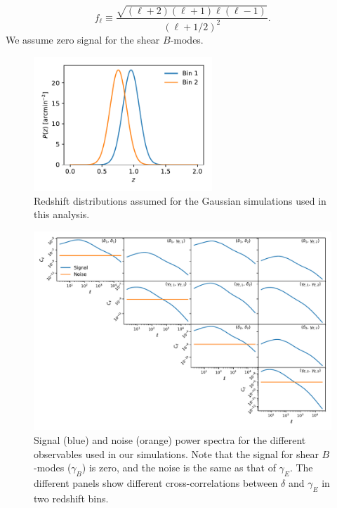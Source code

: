 \documentclass[a4paper,11pt]{article}
\begin{document}
      \begin{equation}
        f_\ell\equiv\frac{\sqrt{(\ell+2)(\ell+1)\ell(\ell-1)}}{(\ell+1/2)^2}.
      \end{equation}
      We assume zero signal for the shear $B$-modes.
      \begin{figure}
        \centering
        \includegraphics[width=0.6\textwidth]{./figures/pz.pdf}
        \caption{Redshift distributions assumed for the Gaussian simulations used in this analysis.}
        \label{fig:pz}
      \end{figure}
      \begin{figure}
        \centering
        \includegraphics[width=\textwidth]{./figures/cls-sph-2b.pdf}
        \caption{Signal (blue) and noise (orange) power spectra for the different observables used in our simulations. Note that the signal for shear $B$-modes ($\gamma_B$) is zero, and the noise is the same as that of $\gamma_E$. The different panels show different cross-correlations between $\delta$ and $\gamma_E$ in two redshift bins.}
        \label{fig:cl-2bins}
      \end{figure}      
\end{document}
